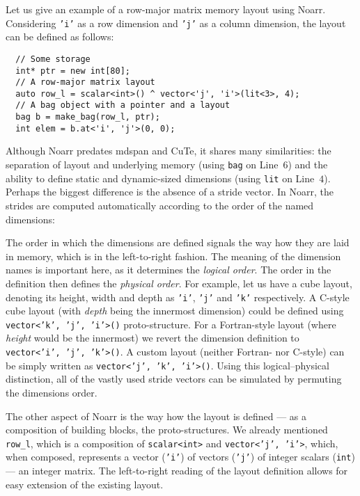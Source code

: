 Let us give an example of a row-major matrix memory layout using Noarr. Considering \texttt{'i'} as a row dimension and \texttt{'j'} as a column dimension, the layout can be defined as follows:

\begin{verbatim}
  // Some storage
  int* ptr = new int[80];
  // A row-major matrix layout
  auto row_l = scalar<int>() ^ vector<'j', 'i'>(lit<3>, 4);
  // A bag object with a pointer and a layout
  bag b = make_bag(row_l, ptr);
  int elem = b.at<'i', 'j'>(0, 0);
\end{verbatim}

Although Noarr predates mdspan and CuTe, it shares many similarities: the separation of layout and underlying memory (using \texttt{bag} on Line~$6$) and the ability to define static and dynamic-sized dimensions (using \texttt{lit} on Line~$4$). Perhaps the biggest difference is the absence of a stride vector. In Noarr, the strides are computed automatically according to the order of the named dimensions:

The order in which the dimensions are defined signals the way how they are laid in memory, which is in the left-to-right fashion. The meaning of the dimension names is important here, as it determines the \emph{logical order}. The order in the definition then defines the \emph{physical order}. For example, let us have a cube layout, denoting its height, width and depth as \texttt{'i'}, \texttt{'j'} and \texttt{'k'} respectively. A C-style cube layout (with \emph{depth} being the innermost dimension) could be defined using \texttt{vector<'k', 'j', 'i'>()} proto-structure. For a Fortran-style layout (where \emph{height} would be the innermost) we revert the dimension definition to \texttt{vector<'i', 'j', 'k'>()}. A custom layout (neither Fortran- nor C-style) can be simply written as \texttt{vector<'j', 'k', 'i'>()}. Using this logical--physical distinction, all of the vastly used stride vectors can be simulated by permuting the dimensions order.

The other aspect of Noarr is the way how the layout is defined --- as a composition of building blocks, the proto-structures. We already mentioned \texttt{row\_l}, which is a composition of \texttt{scalar<int>} and \texttt{vector<'j', 'i'>}, which, when composed, represents a vector (\texttt{'i'}) of vectors (\texttt{'j'}) of integer scalars (\texttt{int}) --- an integer matrix. The left-to-right reading of the layout definition allows for easy extension of the existing layout.

